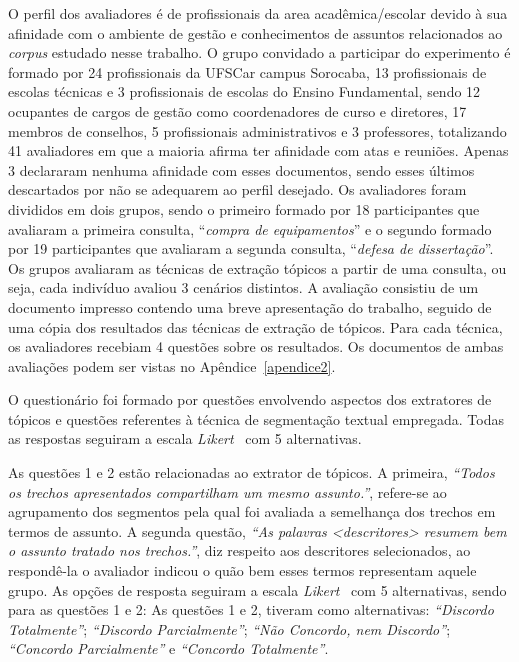 O perfil dos avaliadores é de profissionais da area acadêmica/escolar devido à sua afinidade com o ambiente de gestão e conhecimentos de assuntos relacionados ao \textit{corpus} estudado nesse trabalho. O grupo convidado a participar do experimento é formado por 24 profissionais da UFSCar campus Sorocaba, 13 profissionais de escolas técnicas e 3 profissionais de escolas do Ensino Fundamental, sendo 12 ocupantes de cargos de gestão como coordenadores de curso e diretores, 17 membros de conselhos, 5 profissionais administrativos e 3 professores, totalizando 41 avaliadores em que a maioria afirma ter afinidade com atas e reuniões. Apenas 3 declararam nenhuma afinidade com esses documentos, sendo esses últimos descartados por não se adequarem ao perfil desejado. Os avaliadores foram divididos em dois grupos, sendo o primeiro formado por 18 participantes que avaliaram a primeira consulta, ``\textit{compra de equipamentos}'' e o segundo formado por 19 participantes que avaliaram a segunda consulta, ``\textit{defesa de dissertação}''. Os grupos avaliaram as técnicas de extração tópicos a partir de uma consulta, ou seja, cada indivíduo avaliou 3 cenários distintos. A avaliação consistiu de um documento impresso contendo uma breve apresentação do trabalho, seguido de uma cópia dos resultados das técnicas de extração de tópicos. Para cada técnica, os avaliadores recebiam 4 questões sobre os resultados. Os documentos de ambas avaliações podem ser vistas no Apêndice~\ref{apendice2}.


O questionário foi formado por questões envolvendo aspectos dos extratores de tópicos e questões referentes à técnica de segmentação textual empregada.
Todas as respostas seguiram a escala \textit{Likert}~\cite{Norman2010} com 5 alternativas. 
%

As questões 1 e 2 estão relacionadas ao extrator de tópicos. 
A primeira, \textit{``Todos os trechos apresentados compartilham um mesmo assunto.''}, refere-se ao agrupamento dos segmentos pela qual foi avaliada a semelhança dos trechos em termos de assunto. 
A segunda questão, \textit{``As palavras \textit{<descritores>} resumem bem o assunto tratado nos trechos.''}, diz respeito aos descritores selecionados, ao respondê-la o avaliador indicou o quão bem esses termos representam aquele grupo.
As opções de resposta seguiram a escala \textit{Likert}~\cite{Norman2010} com 5 alternativas, sendo para as questões 1 e 2:
As questões 1 e 2, tiveram como alternativas: 
% 
		\textit{``Discordo Totalmente''}; 
		\textit{``Discordo Parcialmente''}; 
		\textit{``Não Concordo, nem Discordo''}; 
		\textit{``Concordo Parcialmente''} e 
		\textit{``Concordo Totalmente''}.  
%
%
%

